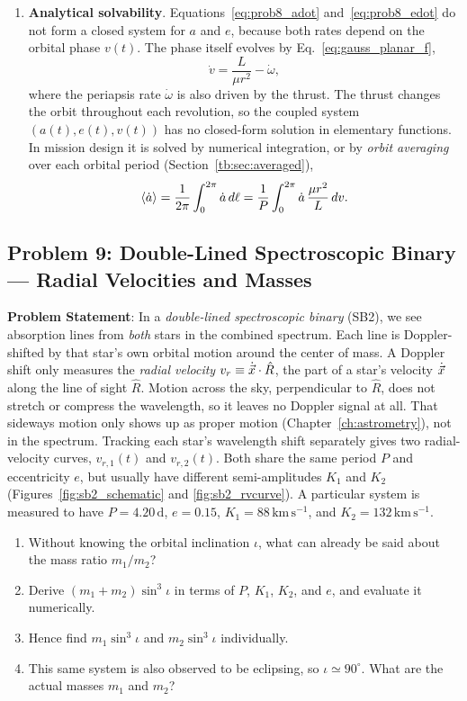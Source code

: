 \begin{enumerate}[label=(\alph*)]
	\item \textbf{Analytical solvability}.
	Equations~\eqref{eq:prob8_adot} and~\eqref{eq:prob8_edot} do not form a closed system for $a$ and $e$, because both rates depend on the orbital phase $v(t)$. The phase itself evolves by Eq.~\eqref{eq:gauss_planar_f},
	\[
	\dot v = \frac{L}{\mu r^2} - \dot\omega,
	\]
	where the periapsis rate $\dot\omega$ is also driven by the thrust. The thrust changes the orbit throughout each revolution, so the coupled system $(a(t), e(t), v(t))$ has no closed-form solution in elementary functions. In mission design it is solved by numerical integration, or by \emph{orbit averaging} over each orbital period (Section~\ref{tb:sec:averaged}),
	\[
	\left\langle \dot a\right\rangle = \frac{1}{2\pi}\int_0^{2\pi}\dot a\,d\ell=\frac{1}{P}\int_0^{2\pi}\dot a\,\frac{\mu r^2}{L}\,dv .
	\]
\end{enumerate}

\subsection{Problem 9: Double-Lined Spectroscopic Binary --- Radial Velocities and Masses}
\label{prob:sb2}

\textbf{Problem Statement}: In a \emph{double-lined spectroscopic binary} (SB2), we see absorption lines from \emph{both} stars in the combined spectrum. Each line is Doppler-shifted by that star's own orbital motion around the center of mass. A Doppler shift only measures the \emph{radial velocity} $v_r\equiv\dot{\vec x}\cdot\hat R$, the part of a star's velocity $\dot{\vec x}$ along the line of sight $\hat R$. Motion across the sky, perpendicular to $\hat R$, does not stretch or compress the wavelength, so it leaves no Doppler signal at all. That sideways motion only shows up as proper motion (Chapter~\ref{ch:astrometry}), not in the spectrum. Tracking each star's wavelength shift separately gives two radial-velocity curves, $v_{r,1}(t)$ and $v_{r,2}(t)$. Both share the same period $P$ and eccentricity $e$, but usually have different semi-amplitudes $K_1$ and $K_2$ (Figures~\ref{fig:sb2_schematic} and \ref{fig:sb2_rvcurve}). A particular system is measured to have $P=4.20\,\mathrm{d}$, $e=0.15$, $K_1=88\,\mathrm{km\,s^{-1}}$, and $K_2=132\,\mathrm{km\,s^{-1}}$.
\begin{enumerate}[label=(\alph*)]
	\item Without knowing the orbital inclination $\iota$, what can already be said about the mass ratio $m_1/m_2$?
	\item Derive $(m_1+m_2)\sin^3\iota$ in terms of $P$, $K_1$, $K_2$, and $e$, and evaluate it numerically.
	\item Hence find $m_1\sin^3\iota$ and $m_2\sin^3\iota$ individually.
	\item This same system is also observed to be eclipsing, so $\iota\simeq90^\circ$. What are the actual masses $m_1$ and $m_2$?
\end{enumerate}

